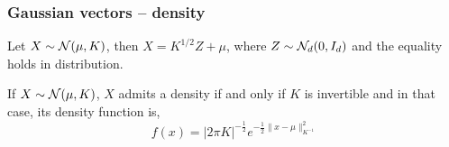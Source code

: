 \documentclass{beamer}
\begin{document}
  \begin{frame}
    \frametitle{Gaussian vectors -- density}

    \begin{proposition}
      Let $X \sim \mathcal{N}(\mu,K)$, then $X =
      K^{1/2}Z + \mu$, where $Z \sim \mathcal{N}_d(0,I_d)$ and the equality holds in
      distribution. 
    \end{proposition}

    \pause

    \begin{corollary}
      
      If $X \sim \mathcal{N}(\mu,K)$, $X$ admits a density if and only if $K$ is
      invertible and in that case, its density function is,
      $$f(x)=|2 \pi K|^{-\frac{1}{2}} e^{-\frac{1}{2}\|x - \mu\|_{K^{-1}}^{2}}$$
    \end{corollary}
  \end{frame}
\end{document}
